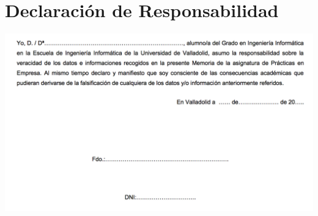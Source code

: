 \documentclass[10pt, a4paper,spanish]{article}
\begin{document}
    \newpage
    \section{Declaración de Responsabilidad}

        \includegraphics[width=\textwidth]{res/responsibility-declaration}
\end{document}
